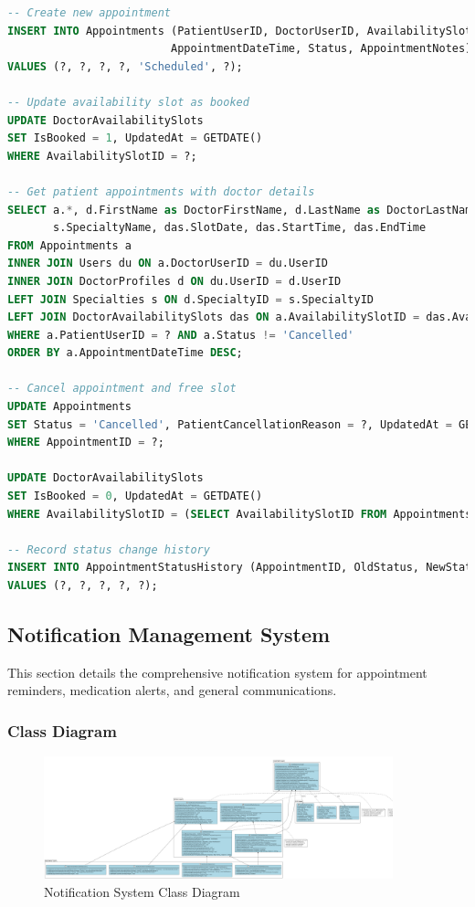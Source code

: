 \documentclass[12pt,a4paper]{article}
\begin{document}
\begin{lstlisting}[language=SQL, caption=Appointment Management Queries]
-- Create new appointment
INSERT INTO Appointments (PatientUserID, DoctorUserID, AvailabilitySlotID, 
                         AppointmentDateTime, Status, AppointmentNotes)
VALUES (?, ?, ?, ?, 'Scheduled', ?);

-- Update availability slot as booked
UPDATE DoctorAvailabilitySlots 
SET IsBooked = 1, UpdatedAt = GETDATE() 
WHERE AvailabilitySlotID = ?;

-- Get patient appointments with doctor details
SELECT a.*, d.FirstName as DoctorFirstName, d.LastName as DoctorLastName, 
       s.SpecialtyName, das.SlotDate, das.StartTime, das.EndTime
FROM Appointments a
INNER JOIN Users du ON a.DoctorUserID = du.UserID
INNER JOIN DoctorProfiles d ON du.UserID = d.UserID
LEFT JOIN Specialties s ON d.SpecialtyID = s.SpecialtyID
LEFT JOIN DoctorAvailabilitySlots das ON a.AvailabilitySlotID = das.AvailabilitySlotID
WHERE a.PatientUserID = ? AND a.Status != 'Cancelled'
ORDER BY a.AppointmentDateTime DESC;

-- Cancel appointment and free slot
UPDATE Appointments 
SET Status = 'Cancelled', PatientCancellationReason = ?, UpdatedAt = GETDATE()
WHERE AppointmentID = ?;

UPDATE DoctorAvailabilitySlots 
SET IsBooked = 0, UpdatedAt = GETDATE() 
WHERE AvailabilitySlotID = (SELECT AvailabilitySlotID FROM Appointments WHERE AppointmentID = ?);

-- Record status change history
INSERT INTO AppointmentStatusHistory (AppointmentID, OldStatus, NewStatus, ChangeReason, ChangedByUserID)
VALUES (?, ?, ?, ?, ?);
\end{lstlisting}

\subsection{Notification Management System}

This section details the comprehensive notification system for appointment reminders, medication alerts, and general communications.

\subsubsection{Class Diagram}

\begin{figure}[H]
\centering
\includegraphics[width=0.9\textwidth]{diagrams/notification_class_diagram.png}
\caption{Notification System Class Diagram}
\label{fig:notification-class-diagram}
\end{figure}
\end{document}
